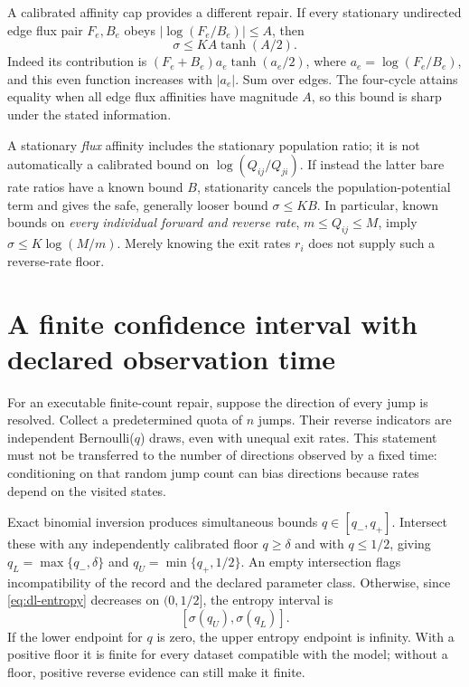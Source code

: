 A calibrated affinity cap provides a different repair. If every stationary
undirected edge flux pair $F_e,B_e$ obeys
$|\log(F_e/B_e)|\le A$, then
\begin{equation}
 \sigma\le K A\tanh(A/2).                              \label{eq:dl-affinity-cap}
\end{equation}
Indeed its contribution is
$(F_e+B_e)a_e\tanh(a_e/2)$, where $a_e=\log(F_e/B_e)$, and this even function
increases with $|a_e|$. Sum over edges. The four-cycle attains equality when
all edge flux affinities have magnitude $A$, so this bound is sharp under the
stated information.

A stationary \emph{flux} affinity includes the stationary population ratio;
it is not automatically a calibrated bound on $\log(Q_{ij}/Q_{ji})$.
If instead the latter bare rate ratios have a known bound $B$, stationarity
cancels the population-potential term and gives the safe, generally looser
bound $\sigma\le KB$. In particular, known bounds on \emph{every individual
forward and reverse rate}, $m\le Q_{ij}\le M$, imply
$\sigma\le K\log(M/m)$. Merely knowing the exit rates $r_i$ does not supply
such a reverse-rate floor.

\section{A finite confidence interval with declared observation time}
For an executable finite-count repair, suppose the direction of every jump is
resolved. Collect a predetermined quota of $n$ jumps. Their reverse indicators
are independent Bernoulli($q$) draws, even with unequal exit rates. This statement
must not be transferred to the number of directions observed by a fixed time:
conditioning on that random jump count can bias directions because rates depend
on the visited states.

Exact binomial inversion produces simultaneous bounds $q\in[q_-,q_+]$.
Intersect these with any independently calibrated floor $q\ge\delta$ and with
$q\le1/2$, giving $q_L=\max\{q_-,\delta\}$ and
$q_U=\min\{q_+,1/2\}$. An empty intersection flags incompatibility of the
record and the declared parameter class. Otherwise, since
\eqref{eq:dl-entropy} decreases on $(0,1/2]$, the entropy interval is
\[
 [\sigma(q_U),\sigma(q_L)].
\]
If the lower endpoint for $q$ is zero, the upper entropy endpoint is infinity.
With a positive floor it is finite for every dataset compatible with the model;
without a floor, positive reverse evidence can still make it finite.

